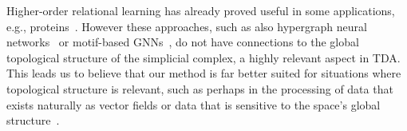 Higher-order relational learning has already proved useful in some applications, e.g., proteins~\cite{ze2020graph}. However these approaches, such as also hypergraph neural networks~\cite{feng2018hypergraphs} or motif-based GNNs~\cite{monti2018motif}, do not have connections to the global topological structure of the simplicial complex, a highly relevant aspect in TDA. 
This leads us to believe that our method is far better suited for situations where topological structure is relevant, such as perhaps in the processing of data that exists naturally as vector fields or data that is sensitive to the space's global structure~\cite{deepsphere}.
